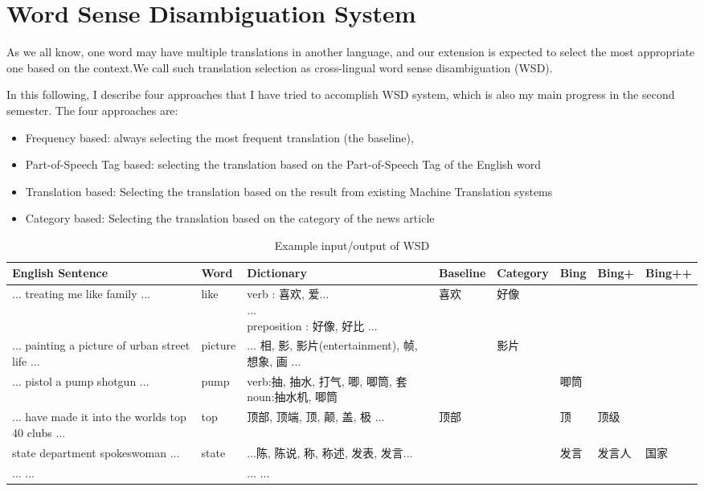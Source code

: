 \section{Word Sense Disambiguation System}
\begin{CJK}{UTF8}{gbsn}
As we all know, one word may have multiple translations in another language, and our extension is expected to select the most appropriate one based on the context.We call such translation selection as cross-lingual word sense disambiguation (WSD).

In this following, I describe four approaches that I have tried to accomplish WSD system, which is also my main progress in the second semester. The four approaches are: 

\begin{itemize}
\item Frequency based: always selecting the most frequent translation (the baseline),
\item Part-of-Speech Tag based: selecting the translation based on the Part-of-Speech Tag of the English word
\item Translation based: Selecting the translation based on the result from existing Machine Translation systems
\item Category based: Selecting the translation based on the category of the news article
\end{itemize}

\begin{table*}[t]
  \caption{Example input/output of WSD}
  \label{table:wsd_1}
  \begin{center}
  \begin{tabular}{| p{3cm} | p{1cm} | p{3.5cm} | p{1.2cm} | p{1.3cm}| p{0.8cm} | p{0.9cm} | p{1cm} |}
    \hline
    English Sentence & Word & Dictionary & Baseline & Category & Bing & Bing+ & Bing++ \\
    \hline
    ... treating me like family ... & like & \parbox[t]{3cm}{verb : 喜欢, 爱...\\ ... \\preposition : 好像, 好比 ...} & 喜欢 & 好像 & & & \\
    \hline
    ... painting a picture of urban street life ... & picture & \parbox[t]{3cm}{... 相, 影, 影片(entertainment), 帧, 想象, 画 ...} & & 影片 & & & \\
    \hline
    ... pistol a pump shotgun ... & pump & \parbox[t]{3cm}{verb:抽, 抽水, 打气, 唧, 唧筒, 套\\ noun:抽水机, 唧筒} & & & 唧筒 & & \\
    \hline
    ... have made it into the worlds top 40 clubs ... & top & \parbox[t]{3cm}{顶部, 顶端, 顶, 颠, 盖, 极 ...} & 顶部 &  & 顶 & 顶级 & \\
    \hline
    state department spokeswoman ... & state & \parbox[t]{3cm}{...陈, 陈说, 称, 称述, 发表, 发言...} & & & 发言 & 发言人 & 国家 \\
    \hline
    ...  ... &  & \parbox[t]{3cm}{...  ...} & & & & & \\
    \hline
  \end{tabular}
  \end{center}
\end{table*}


\end{CJK}
